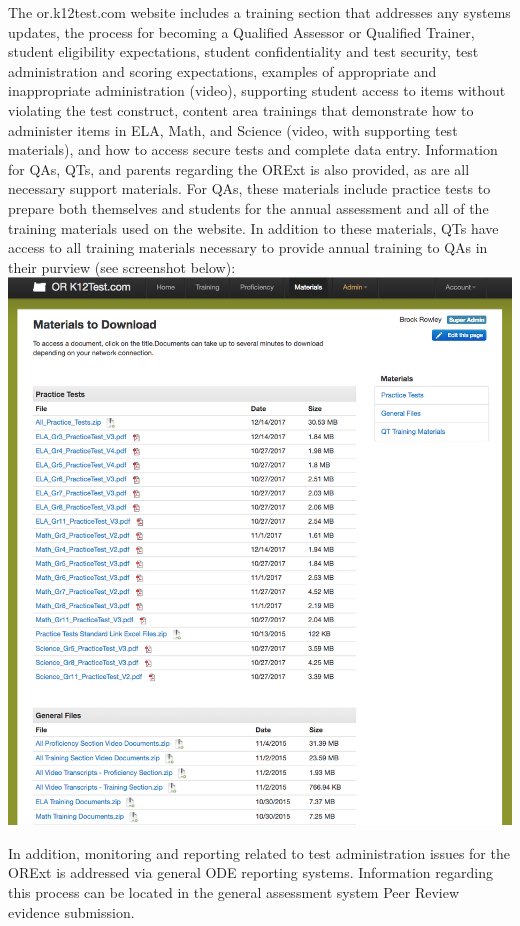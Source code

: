 \documentclass[]{article}
\begin{document}
The or.k12test.com website includes a training section that addresses
any systems updates, the process for becoming a Qualified Assessor or
Qualified Trainer, student eligibility expectations, student
confidentiality and test security, test administration and scoring
expectations, examples of appropriate and inappropriate administration
(video), supporting student access to items without violating the test
construct, content area trainings that demonstrate how to administer
items in ELA, Math, and Science (video, with supporting test materials),
and how to access secure tests and complete data entry. Information for
QAs, QTs, and parents regarding the ORExt is also provided, as are all
necessary support materials. For QAs, these materials include practice
tests to prepare both themselves and students for the annual assessment
and all of the training materials used on the website. In addition to
these materials, QTs have access to all training materials necessary to
provide annual training to QAs in their purview (see screenshot below):
\FloatBarrier  \includegraphics{Figures/TrainingSite/Downloads.png}

In addition, monitoring and reporting related to test administration
issues for the ORExt is addressed via general ODE reporting systems.
Information regarding this process can be located in the general
assessment system Peer Review evidence submission. \clearpage
\end{document}
